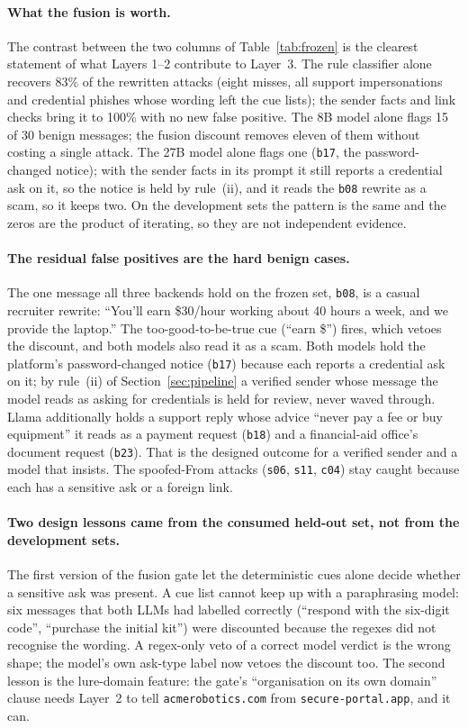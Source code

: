 \documentclass[10pt,twocolumn]{article}
\newcommand{\code}[1]{\texttt{#1}}
\begin{document}
\paragraph{What the fusion is worth.} The contrast between the two columns of Table~\ref{tab:frozen} is the clearest statement of what Layers 1--2 contribute to Layer~3. The rule classifier alone recovers 83\% of the rewritten attacks (eight misses, all support impersonations and credential phishes whose wording left the cue lists); the sender facts and link checks bring it to 100\% with no new false positive. The 8B model alone flags 15 of 30 benign messages; the fusion discount removes eleven of them without costing a single attack. The 27B model alone flags one (\code{b17}, the password-changed notice); with the sender facts in its prompt it still reports a credential ask on it, so the notice is held by rule~(ii), and it reads the \code{b08} rewrite as a scam, so it keeps two. On the development sets the pattern is the same and the zeros are the product of iterating, so they are not independent evidence.

\paragraph{The residual false positives are the hard benign cases.} The one message all three backends hold on the frozen set, \code{b08}, is a casual recruiter rewrite: ``You'll earn \$30/hour working about 40 hours a week, and we provide the laptop.'' The too-good-to-be-true cue (``earn \$'') fires, which vetoes the discount, and both models also read it as a scam. Both models hold the platform's password-changed notice (\code{b17}) because each reports a credential ask on it; by rule~(ii) of Section~\ref{sec:pipeline} a verified sender whose message the model reads as asking for credentials is held for review, never waved through. Llama additionally holds a support reply whose advice ``never pay a fee or buy equipment'' it reads as a payment request (\code{b18}) and a financial-aid office's document request (\code{b23}). That is the designed outcome for a verified sender and a model that insists. The spoofed-From attacks (\code{s06}, \code{s11}, \code{c04}) stay caught because each has a sensitive ask or a foreign link.

\paragraph{Two design lessons came from the consumed held-out set, not from the development sets.} The first version of the fusion gate let the deterministic cues alone decide whether a sensitive ask was present. A cue list cannot keep up with a paraphrasing model: six messages that both LLMs had labelled correctly (``respond with the six-digit code'', ``purchase the initial kit'') were discounted because the regexes did not recognise the wording. A regex-only veto of a correct model verdict is the wrong shape; the model's own ask-type label now vetoes the discount too. The second lesson is the lure-domain feature: the gate's ``organisation on its own domain'' clause needs Layer~2 to tell \code{acmerobotics.com} from \code{secure-portal.app}, and it can.
\end{document}
